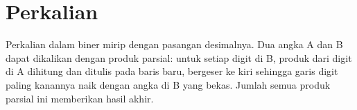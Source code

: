 \section{Perkalian}

Perkalian dalam biner mirip dengan pasangan desimalnya. Dua angka A dan B dapat dikalikan dengan produk parsial: untuk setiap digit di B, produk dari digit di A dihitung dan ditulis pada baris baru, bergeser ke kiri sehingga garis digit paling kanannya naik dengan angka di B yang bekas. Jumlah semua produk parsial ini memberikan hasil akhir.